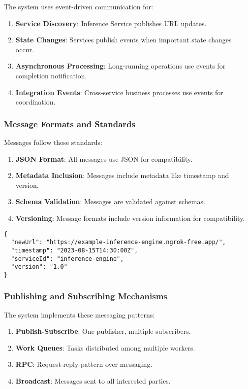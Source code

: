 The system uses event-driven communication for:

\begin{enumerate}
   \item \textbf{Service Discovery}: Inference Service publishes URL updates.
   \item \textbf{State Changes}: Services publish events when important state changes occur.
   \item \textbf{Asynchronous Processing}: Long-running operations use events for completion notification.
   \item \textbf{Integration Events}: Cross-service business processes use events for coordination.
\end{enumerate}

\subsubsection{Message Formats and Standards}

Messages follow these standards:

\begin{enumerate}
   \item \textbf{JSON Format}: All messages use JSON for compatibility.
   \item \textbf{Metadata Inclusion}: Messages include metadata like timestamp and version.
   \item \textbf{Schema Validation}: Messages are validated against schemas.
   \item \textbf{Versioning}: Message formats include version information for compatibility.
\end{enumerate}

\begin{verbatim}
{
  "newUrl": "https://example-inference-engine.ngrok-free.app/",
  "timestamp": "2023-08-15T14:30:00Z",
  "serviceId": "inference-engine",
  "version": "1.0"
}
\end{verbatim}

\subsubsection{Publishing and Subscribing Mechanisms}

The system implements these messaging patterns:

\begin{enumerate}
   \item \textbf{Publish-Subscribe}: One publisher, multiple subscribers.
   \item \textbf{Work Queues}: Tasks distributed among multiple workers.
   \item \textbf{RPC}: Request-reply pattern over messaging.
   \item \textbf{Broadcast}: Messages sent to all interested parties.
\end{enumerate}

